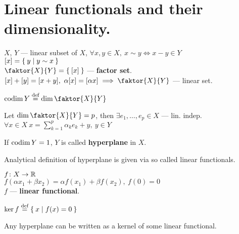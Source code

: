 \section{Linear functionals and their dimensionality.}
\begin{defn}
  $X$, $Y$ --- linear subset of $X$, $\forall x, y \in X,\ x \sim y \iff x - y
  \in Y$ \\
  $[x] = \Set{y | y \sim x}$ \\
  $\faktor{X}{Y} = \Set{[x]}$ --- \textbf{factor set}. \\
  $[x] + [y] = [x + y],\ \alpha [x] = [\alpha x] \implies \faktor{X}{Y}$ --- linear set.
\end{defn}
\begin{defn}
  $\codim{Y} \defeq \dim{\faktor{X}{Y}}$
\end{defn}

\begin{stm}
  Let $\dim{\faktor{X}{Y}} = p$, then $\exists e_1, \dotsc, e_p \in X$ --- lin. indep. \\
  $\forall x \in X\ x = \sum\limits_{k = 1}^p \alpha_k e_k + y,\ y \in Y$
\end{stm}

\noindent 
\begin{defn}
  If $\operatorname{codim}{Y} = 1$, $Y$ is called \textbf{hyperplane} in $X$.
\end{defn}

\noindent
Analytical definition of hyperplane is given via so called linear functionals.

\begin{defn}
  $f \colon X \to \mathbb{R}$  \\
  $f(\alpha x_1 + \beta x_2) = \alpha f(x_1) + \beta f(x_2),\ f(0) = 0$ \\
  $f$ --- \textbf{linear functional}.
\end{defn}

\begin{defn}
  $\ker{f} \overset{\text{def}}{=} \Set{x | f(x) = 0}$
\end{defn}

\begin{stm}
  Any hyperplane can be written as a kernel of some linear functional.
\end{stm}

